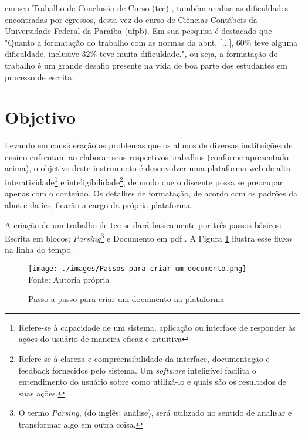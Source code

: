 \clearpage

\cite{santos}
em seu Trabalho de Conclusão de Curso
(\acrshort{tcc})
, também analisa as
dificuldades encontradas por egressos, desta vez do curso de Ciências Contábeis da
Universidade Federal da Paraíba
(\acrshort{ufpb}).
Em sua pesquisa é destacado que "Quanto a
formatação do trabalho com as normas da 
\acrshort{abnt}, {[}...{]}, 60\% teve alguma dificuldade, inclusive
32\% teve muita dificuldade.", ou seja, a formatação do trabalho é um grande desafio presente
na vida de boa parte dos estudantes em processo de escrita.

\section{Objetivo}

Levando em consideração os problemas que os alunos de diversas instituições de ensino enfrentam ao elaborar seus respectivos
trabalhos (conforme apresentado acima), o objetivo deste instrumento é desenvolver uma plataforma
\acrshort{web}
de alta
interatividade\footnote{Refere-se à capacidade de um sistema, aplicação ou interface de responder
        às ações do usuário de maneira eficaz e intuitiva}
e
inteligibilidade\footnote{Refere-se à clareza e compreensibilidade da interface, documentação e feedback fornecidos pelo
    sistema. Um \textit{software} inteligível facilita o entendimento do usuário sobre como utilizá-lo e quais são os resultados de suas ações.},
de modo que o discente possa se preocupar apenas com o conteúdo. Os detalhes de formatação, de acordo com os padrões da
\acrshort{abnt}
e da
\acrshort{ies},
ficarão a cargo da própria plataforma.

A criação de um trabalho de
\acrshort{tcc}
se dará basicamente por três passos básicos: Escrita em blocos;
\textit{Parsing}\footnote{O termo \textit{Parsing}, (do inglês: análise), será utilizado no
sentido de analisar e transformar algo em outra coisa.}
e
Documento em
\acrshort{pdf}
. A Figura \ref{fig:Passos para criar um documento} ilustra esse fluxo na linha do tempo.

\begin{figure}[H]
    \centering
    \caption{Passo a passo para criar um documento na plataforma}
    \texttt{[image: ./images/Passos para criar um documento.png]}
    \label{fig:Passos para criar um documento} \\
    \textnormal{\fontsize{10pt}{12pt}Fonte: Autoria própria}
\end{figure}

